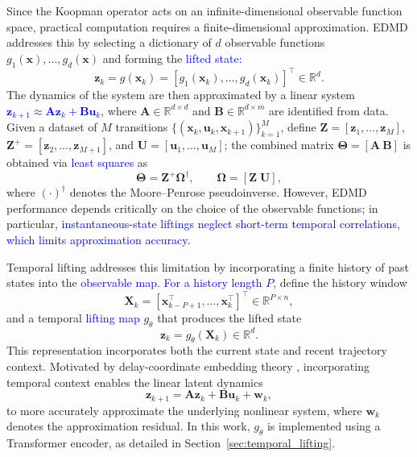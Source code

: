\documentclass[journal]{IEEEtran}
\newcommand{\vx}{\mathbf{x}}
\newcommand{\vu}{\mathbf{u}}
\newcommand{\vz}{\mathbf{z}}
\newcommand{\vw}{\mathbf{w}}
\newcommand{\mA}{\mathbf{A}}
\newcommand{\mB}{\mathbf{B}}
\newcommand{\mX}{\mathbf{X}}
\newcommand{\mZ}{\mathbf{Z}}
\newcommand{\mU}{\mathbf{U}}
\newcommand{\mTheta}{\boldsymbol{\Theta}}
\newcommand{\mOmega}{\boldsymbol{\Omega}}
\begin{document}
Since the Koopman operator acts on an infinite-dimensional observable function space, practical computation requires a finite-dimensional approximation. EDMD addresses this by selecting a dictionary of $d$ observable functions $g_1(\vx),\ldots,g_d(\vx)$ and forming the \textcolor{blue}{lifted state:}
\begin{equation}
    \vz_k = g(\vx_k) = [g_1(\vx_k), \ldots, g_d(\vx_k)]^\top \in \mathbb{R}^d.
    \label{eq:instantaneous_lifting}
\end{equation}
The dynamics of the system are then approximated by a linear system \textcolor{blue}{$\vz_{k+1} \approx \mA \vz_k + \mB \vu_k$}, where $\mA \in \mathbb{R}^{d \times d}$ and $\mB \in \mathbb{R}^{d \times m}$ are identified from data. Given a dataset of $M$ transitions $\{(\vx_k, \vu_k, \vx_{k+1})\}_{k=1}^M$, define $\mZ = [\vz_1,\ldots,\vz_M]$, $\mZ^+ = [\vz_2,\ldots,\vz_{M+1}]$, and $\mU = [\vu_1,\ldots,\vu_M]$; the combined matrix $\mTheta = [\mA\ \mB]$ is obtained via \textcolor{blue}{least squares} as
\begin{equation}
    \mTheta = \mZ^+ \mOmega^\dagger, \qquad \mOmega = [\mZ\; \mU],
    \label{eq:edmd_regression}
\end{equation}
where $(\cdot)^\dagger$ denotes the Moore--Penrose pseudoinverse. However, EDMD performance depends critically on the choice of the observable functions; in particular, \textcolor{blue}{instantaneous-state liftings neglect short-term temporal correlations, which limits approximation accuracy.}

Temporal lifting addresses this limitation by incorporating a finite history of past states into the \textcolor{blue}{observable map}. \textcolor{blue}{For a history length $P$}, define the history window
\begin{equation}
    \mX_k = [\vx_{k-P+1}^\top, \ldots, \vx_k^\top]^\top \in \mathbb{R}^{P\times n},
    \label{eq:history_window}
\end{equation}
and a temporal \textcolor{blue}{lifting map} $g_\theta$ that produces the lifted state
\begin{equation}
    \vz_k = g_\theta(\mX_k) \in \mathbb{R}^d.
    \label{eq:temporal_lifting}
\end{equation}
This representation incorporates both the current state and recent trajectory context. Motivated by delay-coordinate embedding theory \cite{arbabi2017ergodic, rank2019recurrent}, incorporating temporal context enables the linear latent dynamics
\begin{equation}
    \vz_{k+1} = \mA \vz_k + \mB \vu_k + \vw_k,
    \label{eq:lifted_dynamics_prelim}
\end{equation}
to more accurately approximate the underlying nonlinear system, where $\vw_k$ denotes the approximation residual. In this work, $g_\theta$ is implemented using a Transformer encoder, as detailed in Section~\ref{sec:temporal_lifting}.
\end{document}
